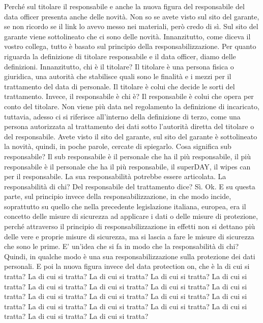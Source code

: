 Perché sul titolare il responsabile e anche la nuova figura del responsabile del data officer presenta anche delle novità.
Non so se avete visto sul sito del garante, se non ricordo se il link lo avevo messo nei materiali, però credo di sì.
Sul sito del garante viene sottolineato che ci sono delle novità.
Innanzitutto, come diceva il vostro collega, tutto è basato sul principio della responsabilizzazione.
Per quanto riguarda la definizione di titolare responsabile e il data officer, diamo delle definizioni.
Innanzitutto, chi è il titolare?
Il titolare è una persona fisica o giuridica, una autorità che stabilisce quali sono le finalità e i mezzi per il trattamento del data di personale.
Il titolare è colui che decide le sorti del trattamento.
Invece, il responsabile è chi è?
Il responsabile è colui che opera per conto del titolare.
Non viene più data nel regolamento la definizione di incaricato, tuttavia, adesso ci si riferisce all'interno della definizione di terzo, come una persona autorizzata al trattamento dei dati sotto l'autorità diretta del titolare o del responsabile.
Avete visto il sito del garante, sul sito del garante è sottolineato la novità, quindi, in poche parole, cercate di spiegarlo.
Cosa significa sub responsabile?
Il sub responsabile è il personale che ha il più responsabile, il più responsabile è il personale che ha il più responsabile, il superDAY, il wipes can per il responsabile.
La sua responsabilità potrebbe essere articolata.
La responsabilità di chi?
Del responsabile del trattamento dice?
Sì.
Ok.
E su questa parte, sul principio invece della responsabilizzazione, in che modo incide, soprattutto su quello che nella precedente legislazione italiana, europea, era il concetto delle misure di sicurezza ad applicare i dati o delle misure di protezione, perché attraverso il principio di responsabilizzazione in effetti non si dettano più delle vere e proprie misure di sicurezza, ma si lascia a fare le misure di sicurezza che sono le prime.
E' un'idea che si fa in modo che la responsabilità di chi?
Quindi, in qualche modo è una sua responsabilizzazione sulla protezione dei dati personali.
E poi la nuova figura invece del data protection on, che è la di cui si tratta?
La di cui si tratta?
La di cui si tratta?
La di cui si tratta?
La di cui si tratta?
La di cui si tratta?
La di cui si tratta?
La di cui si tratta?
La di cui si tratta?
La di cui si tratta?
La di cui si tratta?
La di cui si tratta?
La di cui si tratta?
La di cui si tratta?
La di cui si tratta?
La di cui si tratta?
La di cui si tratta?
La di cui si tratta?
La di cui si tratta?
